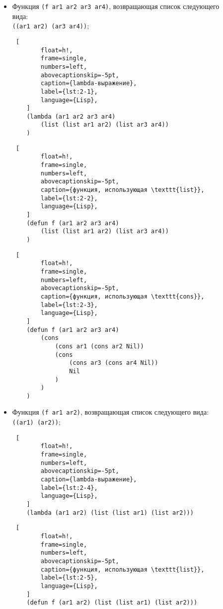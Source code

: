\begin{itemize}
    \item Функция \texttt{(f ar1 ar2 ar3 ar4)}, возвращающая список следующего\\ вида:\\\texttt{((ar1 ar2) (ar3 ar4))};
    
    \begin{lstlisting} [
		float=h!,
		frame=single,
		numbers=left,
		abovecaptionskip=-5pt,
		caption={lambda-выражение},
		label={lst:2-1},
		language={Lisp},
	]
    (lambda (ar1 ar2 ar3 ar4) 
        (list (list ar1 ar2) (list ar3 ar4))
    )
    \end{lstlisting}
    
    \begin{lstlisting} [
		float=h!,
		frame=single,
		numbers=left,
		abovecaptionskip=-5pt,
		caption={функция, использующая \texttt{list}},
		label={lst:2-2},
		language={Lisp},
	]
    (defun f (ar1 ar2 ar3 ar4) 
        (list (list ar1 ar2) (list ar3 ar4))
    )
    \end{lstlisting}

    \begin{lstlisting} [
		float=h!,
		frame=single,
		numbers=left,
		abovecaptionskip=-5pt,
		caption={функция, использующая \texttt{cons}},
		label={lst:2-3},
		language={Lisp},
	]
    (defun f (ar1 ar2 ar3 ar4) 
        (cons 
            (cons ar1 (cons ar2 Nil)) 
            (cons 
                (cons ar3 (cons ar4 Nil)) 
                Nil
            )
        )
    )
    \end{lstlisting}

    \item Функция \texttt{(f ar1 ar2)}, возвращающая список следующего вида:\\\texttt{((ar1) (ar2))};
    
    \begin{lstlisting} [
		float=h!,
		frame=single,
		numbers=left,
		abovecaptionskip=-5pt,
		caption={lambda-выражение},
		label={lst:2-4},
		language={Lisp},
	]
    (lambda (ar1 ar2) (list (list ar1) (list ar2)))
    \end{lstlisting}
    
    \begin{lstlisting} [
		float=h!,
		frame=single,
		numbers=left,
		abovecaptionskip=-5pt,
		caption={функция, использующая \texttt{list}},
		label={lst:2-5},
		language={Lisp},
	]
    (defun f (ar1 ar2) (list (list ar1) (list ar2)))
    \end{lstlisting}
    

\end{itemize}
